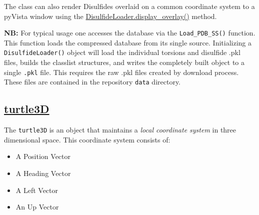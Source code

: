 \begin{Shaded}
\begin{Highlighting}[]
\OperatorTok{=}\NormalTok{ SS2[:}\NormalTok{]}
\NormalTok{  [}\OperatorTok{\textless{}}\OperatorTok{\textgreater{}}\NormalTok{, }
  \OperatorTok{\textless{}}\OperatorTok{\textgreater{}}\NormalTok{]}
\end{Highlighting}
\end{Shaded}

The class can also render Disulfides overlaid on a common coordinate
system to a pyVista window using the
\href{https://suchanek.github.io/proteusPy/proteusPy/DisulfideLoader.html\#DisulfideLoader.display_overlay}{DisulfideLoader.display\_overlay()}
method.

\textbf{NB:} For typical usage one accesses the database via the
\texttt{Load\_PDB\_SS()} function. This function loads the compressed
database from its single source. Initializing a
\texttt{DisulfideLoader()} object will load the individual torsions and
disulfide .pkl files, builds the classlist structures, and writes the
completely built object to a single \texttt{.pkl} file. This requires
the raw .pkl files created by download process. These files are
contained in the repository \texttt{data} directory.

\hypertarget{turtle3d}{%
\subsection{\texorpdfstring{\href{https://suchanek.github.io/proteusPy/proteusPy/turtle3D.html}{turtle3D}}{turtle3D}}\label{turtle3d}}

The \texttt{turtle3D} is an object that maintains a \emph{local
coordinate system} in three dimensional space. This coordinate system
consists of:

\begin{itemize}
\tightlist
\item
  A Position Vector
\item
  A Heading Vector
\item
  A Left Vector
\item
  An Up Vector
\end{itemize}

